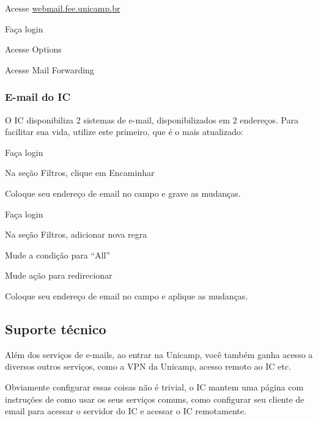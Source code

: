 \begin{compactenumerate}
    \item  Acesse \url{webmail.fee.unicamp.br}
    \item  Faça login
    \item  Acesse Options
    \item  Acesse Mail Forwarding
\end{compactenumerate}

\subsubsection{E-mail do IC}

O IC disponibiliza 2 sistemas de e-mail, disponibilizados em 2 endereços. Para
facilitar sua vida, utilize este primeiro, que é o mais atualizado:

\begin{compactenumerate}
    \item  {}
    \item  Faça login
    \item  Na seção Filtros, clique em Encaminhar
    \item  Coloque seu endereço de email no campo e grave as mudanças.
\end{compactenumerate}

\begin{compactenumerate}
    \item  {}
    \item  Faça login
    \item  Na seção Filtros, adicionar nova regra
    \item  Mude a condição para ``All''
    \item  Mude ação para redirecionar
    \item  Coloque seu endereço de email no campo e aplique as mudanças.
\end{compactenumerate}

\subsection{Suporte técnico}

Além dos serviços de e-mails, ao entrar na Unicamp, você também ganha acesso a
diversos outros serviços, como a VPN da Unicamp, acesso remoto ao IC etc.

Obviamente configurar essas coisas não é trivial, o IC mantem uma página com
instruções de como usar os seus serviços comuns, como configurar seu cliente de
email para acessar o servidor do IC e acessar o IC remotamente.

